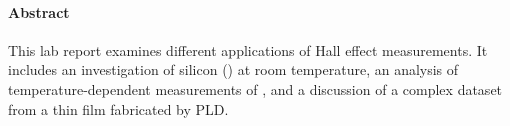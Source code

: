 \paragraph{Abstract}
This lab report examines different applications of Hall effect 
measurements. 
It includes an investigation of silicon () at room temperature, 
an analysis of temperature-dependent measurements of , and a 
discussion of a complex dataset from a  thin film fabricated 
by PLD.
